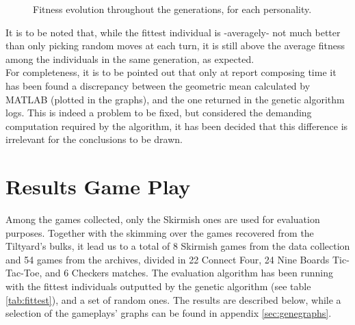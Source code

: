 \begin{figure}[ht!]
	\quad
  \captionsetup{justification=centering}
    \caption{Fitness evolution throughout the generations, for each personality.}
    \label{fig:fitnessfunc}
\end{figure}
It is to be noted that, while the fittest individual is -averagely- not much better than only picking random moves at each turn, it is still above the average fitness among the individuals in the same generation, as expected.\\
For completeness, it is to be pointed out that only at report composing time it has been found a discrepancy between the geometric mean calculated by MATLAB (plotted in the graphs), and the one returned in the genetic algorithm logs. This is indeed a problem to be fixed, but considered the demanding computation required by the algorithm, it has been decided that this difference is irrelevant for the conclusions to be drawn.

\section{Results Game Play}\label{sec:reeval}
Among the games collected, only the Skirmish ones are used for evaluation purposes. Together with the skimming over the games recovered from the Tiltyard's bulks, it lead us to a total of 8 Skirmish games from the data collection and 54 games from the archives, divided in 22 Connect Four, 24 Nine Boards Tic-Tac-Toe, and 6 Checkers matches.
The evaluation algorithm has been running with the fittest individuals outputted by the genetic algorithm (see table \ref{tab:fittest}), and a set of random ones. The results are described below, while a selection of the gameplays' graphs can be found in appendix \ref{sec:genegraphs}.
